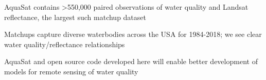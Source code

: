 \documentclass[draft,linenumbers]{agujournal2018}
\begin{document}





\begin{keypoints}
\item AquaSat contains \textgreater{}550,000 paired observations of water
quality and Landsat reflectance, the largest such matchup dataset
\item Matchups capture diverse waterbodies across the USA for 1984-2018; we
see clear water quality/reflectance relationships
\item AquaSat and open source code developed here will enable better
development of models for remote sensing of water quality
\end{keypoints}

%
%

\end{document}
